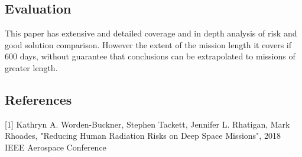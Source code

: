 \documentclass[11pt]{article}
\begin{document}
\begin{center}
\section*{Evaluation} 
\end{center}
This paper has extensive and detailed coverage and in depth analysis of risk and good solution comparison. However the extent of the mission length it covers if 600 days, without guarantee that conclusions can be extrapolated to missions of greater length.

\newpage
\begin{center}
\section*{References}
\end{center}
{[1]} Kathryn A. Worden-Buckner, Stephen Tackett, Jennifer L. Rhatigan, Mark Rhoades, "Reducing Human Radiation Risks on Deep Space Missions", 2018 IEEE Aerospace Conference
\end{document}
